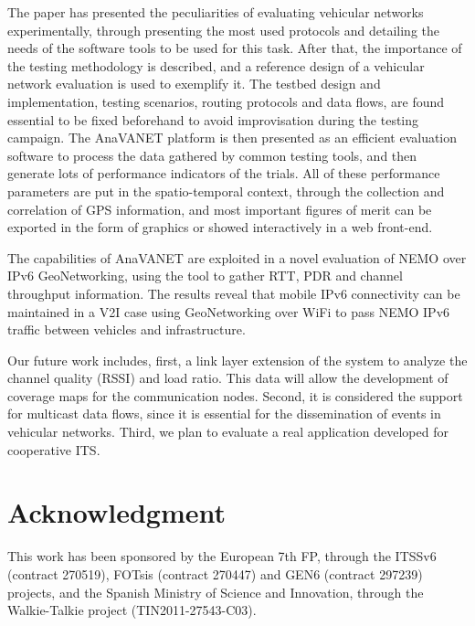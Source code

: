 \documentclass[fonts]{icst}
\begin{document}
The paper has presented the peculiarities of evaluating vehicular networks experimentally, through
presenting the most used protocols and detailing the needs of the software tools
to be used for this task. After that, the importance of the testing
methodology is described, and a reference design of a vehicular network
evaluation is used to exemplify it. The testbed design and implementation,
testing scenarios, routing protocols and data flows, are found essential to be
fixed beforehand to avoid improvisation during the testing campaign. The
AnaVANET platform is then presented as an efficient evaluation software to
process the data gathered by common testing tools, and then generate lots of performance
indicators of the trials. 
All of these performance parameters are put in the
spatio-temporal context, through the collection and correlation of GPS
information, and most important figures of merit can be exported in the form of
graphics or showed interactively in a web front-end.

The capabilities of AnaVANET are exploited in a novel evaluation of NEMO over
IPv6 GeoNetworking, using the tool to gather RTT, PDR and channel throughput
information. The results reveal that mobile IPv6 connectivity can be maintained
in a V2I case using GeoNetworking over WiFi to pass NEMO IPv6 traffic between
vehicles and infrastructure.


Our future work includes, first, a link layer extension of the system to
analyze the channel quality (RSSI) and load ratio. This data will allow the development of coverage maps for the communication nodes. Second, it is considered the support for multicast data flows, since it is essential for the dissemination of events in vehicular networks. Third, we plan to evaluate a real application developed for 
cooperative ITS. 




\section*{Acknowledgment}

This work has been sponsored by the European 7th FP, through the ITSSv6 (contract 270519), FOTsis (contract 270447) and GEN6 (contract 297239) projects, and the Spanish Ministry of Science and Innovation, through the Walkie-Talkie project (TIN2011-27543-C03).



\end{document}
